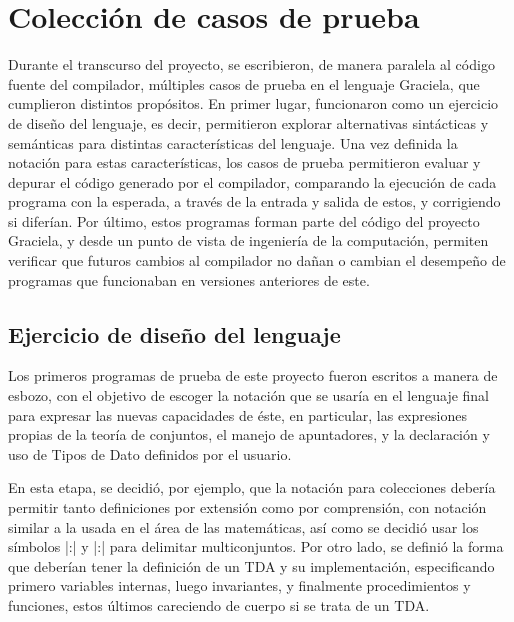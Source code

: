 {{%
\section{Colección de casos de prueba}

Durante el transcurso del proyecto, se escribieron, de manera paralela al código
fuente del compilador, múltiples casos de prueba en el lenguaje Graciela, 
que cumplieron distintos propósitos. En primer lugar, funcionaron como un 
ejercicio de diseño del lenguaje, es decir, permitieron explorar alternativas 
sintácticas y semánticas para distintas características del lenguaje. Una vez
definida la notación para estas características, los casos de prueba 
permitieron evaluar y depurar el código generado por el compilador, comparando 
la ejecución de cada programa con la esperada, a través de la entrada y salida 
de estos, y corrigiendo si diferían. Por último, estos programas forman parte 
del código del proyecto Graciela, y desde un punto de vista de ingeniería de 
la computación, permiten verificar que futuros cambios al compilador no dañan 
o cambian el desempeño de programas que funcionaban en versiones anteriores de 
este.

\subsection{Ejercicio de diseño del lenguaje}

Los primeros programas de prueba de este proyecto fueron escritos a manera 
de esbozo, con el objetivo de escoger la notación que se usaría en el lenguaje 
final para expresar las nuevas capacidades de éste, en particular, las 
expresiones propias de la teoría de conjuntos, el manejo de apuntadores, y la
declaración y uso de Tipos de Dato definidos por el usuario.

En esta etapa, se decidió, por ejemplo, que la notación para colecciones debería
permitir tanto definiciones por extensión como por comprensión, con notación 
similar a la usada en el área de las matemáticas, así como se decidió usar los 
símbolos \ingra|{:| y \ingra|:}| para delimitar multiconjuntos. Por otro lado,
se definió la forma que deberían tener la definición de un TDA y su 
implementación, especificando primero variables internas, luego invariantes, y 
finalmente procedimientos y funciones, estos últimos careciendo de cuerpo si se
trata de un TDA.

}}
